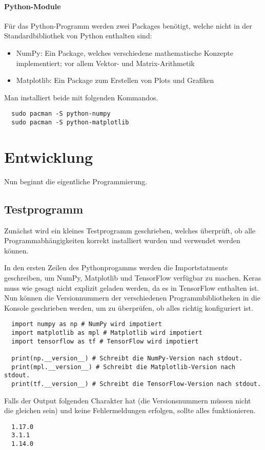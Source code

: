 \paragraph{Python-Module}

Für das Python-Programm werden zwei Packages benötigt, welche
nicht in der Standardbibliothek von Python enthalten sind:
\begin{itemize}
\item{NumPy: Ein Package, welches verschiedene mathematische Konzepte
    implementiert; vor allem Vektor- und Matrix-Arithmetik}
\item{Matplotlib: Ein Package zum Erstellen von Plots und Grafiken}
\end{itemize}

Man installiert beide mit folgenden Kommandos.
\begin{verbatim}
  sudo pacman -S python-numpy
  sudo pacman -S python-matplotlib
\end{verbatim}

\section{Entwicklung}
Nun beginnt die eigentliche Programmierung.

\subsection{Testprogramm}
Zunächst wird ein kleines Testprogramm geschrieben, welches überprüft, ob
alle Programmabhängigkeiten korrekt installiert wurden und verwendet werden können.

In den ersten Zeilen des Pythonprogamms werden die Importstatments
geschreiben, um NumPy, Matplotlib und TensorFlow verfügbar zu machen.
Keras muss wie gesagt nicht explizit geladen werden, da es in TensorFlow
enthalten ist.
Nun können die Versionnummern der verschiedenen Programmbibliotheken
in die Konsole geschrieben werden, um zu überprüfen, ob alles richtig konfiguriert ist.
\begin{verbatim}
  import numpy as np # NumPy wird impotiert
  import matplotlib as mpl # Matplotlib wird impotiert
  import tensorflow as tf # TensorFlow wird impotiert

  print(np.__version__) # Schreibt die NumPy-Version nach stdout.
  print(mpl.__version__) # Schreibt die Matplotlib-Version nach stdout.
  print(tf.__version__) # Schreibt die TensorFlow-Version nach stdout.
\end{verbatim}
Falls der Output folgenden Charakter hat (die Versionsnummern müssen nicht
die gleichen sein) und keine Fehlermeldungen erfolgen, sollte alles funktionieren.
\begin{verbatim}
  1.17.0
  3.1.1
  1.14.0
\end{verbatim}
\para{}

